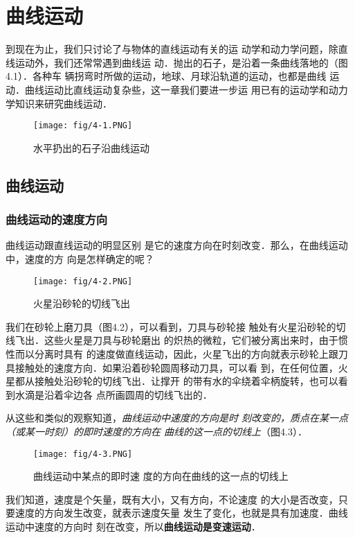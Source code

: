 \chapter{曲线运动}\label{chapter-curvilinear-motion}
    到现在为止，我们只讨论了与物体的直线运动有关的运
动学和动力学问题，除直线运动外，我们还常常遇到曲线运
动．抛出的石子，是沿着一条曲线落地的（图4.1）．各种车
辆拐弯时所做的运动，地球、月球沿轨道的运动，也都是曲线
运动．曲线运动比直线运动复杂些，这一章我们要进一步运
用已有的运动学和动力学知识来研究曲线运动．

\begin{figure}[htp]
\centering
\texttt{[image: fig/4-1.PNG]}
\caption{水平扔出的石子沿曲线运动}
\end{figure}

\section{曲线运动}
    \subsection{曲线运动的速度方向}
    
    曲线运动跟直线运动的明显区别
是它的速度方向在时刻改变．那么，在曲线运动中，速度的方
向是怎样确定的呢？

\begin{figure}[htp]
    \centering
    \texttt{[image: fig/4-2.PNG]}
    \caption{火星沿砂轮的切线飞出}
    \end{figure}

    我们在砂轮上磨刀具（图4.2），可以看到，刀具与砂轮接
触处有火星沿砂轮的切线飞出．这些火星是刀具与砂轮磨出
的炽热的微粒，它们被分离出来时，由于惯性而以分离时具有
的速度做直线运动，因此，火星飞出的方向就表示砂轮上跟刀
具接触处的速度方向．如果沿着砂轮圆周移动刀具，可以看
到，在任何位置，火星都从接触处沿砂轮的切线飞出．让撑开
的带有水的伞绕着伞柄旋转，也可以看到水滴是沿着伞边各
点所画圆周的切线飞出的．

从这些和类似的观察知道，\textit{曲线运动中速度的方向是时
刻改变的，质点在某一点（或某一时刻）的即时速度的方向在
曲线的这一点的切线上}（图4.3）．

\begin{figure}[htp]
    \centering
    \texttt{[image: fig/4-3.PNG]}
    \caption{曲线运动中某点的即时速
度的方向在曲线的这一点的切线上}
    \end{figure}

我们知道，速度是个矢量，既有大小，又有方向，不论速度
的大小是否改变，只要速度的方向发生改变，就表示速度矢量
发生了变化，也就是具有加速度．曲线运动中速度的方向时
刻在改变，所以\textbf{曲线运动是变速运动}．

